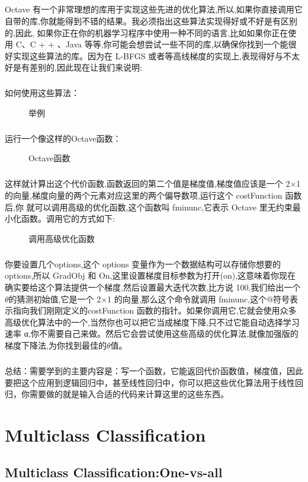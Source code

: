 \documentclass{article}
\begin{document}
\begin{CJK}{UTF8}{gbsn}
\subparagraph{}
Octave 有一个非常理想的库用于实现这些先进的优化算法,所以,如果你直接调用它
自带的库,你就能得到不错的结果。我必须指出这些算法实现得好或不好是有区别的,因此,
如果你正在你的机器学习程序中使用一种不同的语言,比如如果你正在使用 C、C + + 、Java
等等,你可能会想尝试一些不同的库,以确保你找到一个能很好实现这些算法的库。因为在
L-BFGS 或者等高线梯度的实现上,表现得好与不太好是有差别的,因此现在让我们来说明:
\subparagraph{}
如何使用这些算法：
\begin{figure}[H]
\caption{举例}
\label{fig:330}
\end{figure}
\subparagraph{}
运行一个像这样的Octave函数：
\begin{figure}[H]
\caption{Octave函数}
\label{fig:331}
\end{figure}
\subparagraph{}
这样就计算出这个代价函数,函数返回的第二个值是梯度值,梯度值应该是一个 2×1的向量,梯度向量的两个元素对应这里的两个偏导数项,运行这个 costFunction 函数后,你
就可以调用高级的优化函数,这个函数叫 fminunc,它表示 Octave 里无约束最小化函数。调用它的方式如下:
\begin{figure}[H]
\caption{调用高级优化函数}
\label{fig:332}
\end{figure}
\subparagraph{}
你要设置几个options,这个 options 变量作为一个数据结构可以存储你想要的 options,所以 GradObj 和 On,这里设置梯度目标参数为打开(on),这意味着你现在确实要给这个算法提供一个梯度,然后设置最大迭代次数,比方说 100,我们给出一个$\theta$的猜测初始值,它是一个 2×1 的向量,那么这个命令就调用 fminunc,这个@符号表示指向我们刚刚定义的costFunction 函数的指针。如果你调用它,它就会使用众多高级优化算法中的一个,当然你也可以把它当成梯度下降,只不过它能自动选择学习速率 α,你不需要自己来做。然后它会尝试使用这些高级的优化算法,就像加强版的梯度下降法,为你找到最佳的$\theta$值。
\subparagraph{}
总结：需要学到的主要内容是：写一个函数，它能返回代价函数值，梯度值，因此要把这个应用到逻辑回归中，甚至线性回归中，你可以把这些优化算法用于线性回归，你需要做的就是输入合适的代码来计算这里的这些东西。
\section{Multiclass Classification}
\subsection{Multiclass Classification:One-vs-all}
\subparagraph{}


\end{CJK}
\end{document}
